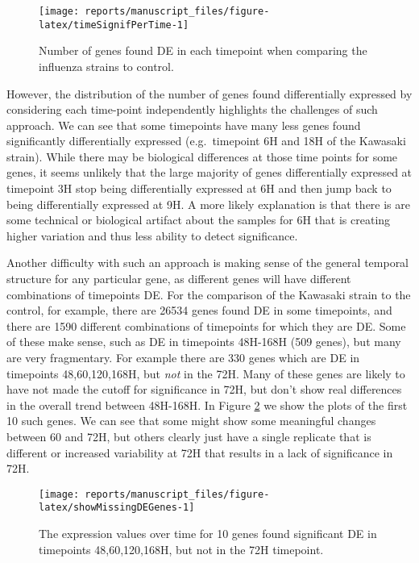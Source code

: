 \documentclass[9pt,a4paper,]{extarticle}
\begin{document}
\begin{figure}[H]

{\centering \texttt{[image: reports/manuscript\_files/figure-latex/timeSignifPerTime-1]} 

}

\caption{Number of genes found DE in each timepoint when comparing the influenza strains to control.}\label{fig:timeSignifPerTime}
\end{figure}

However, the distribution of the number of genes found differentially
expressed by considering each time-point independently highlights the
challenges of such approach. We can see that some timepoints have many less
genes found significantly differentially expressed (e.g.~timepoint 6H and 18H
of the Kawasaki strain). While there may be biological differences at those
time points for some genes, it seems unlikely that the large majority of genes
differentially expressed at timepoint 3H stop being differentially expressed
at 6H and then jump back to being differentially expressed at 9H. A more
likely explanation is that there is are some technical or biological artifact
about the samples for 6H that is creating higher variation and thus less
ability to detect significance.

Another difficulty with such an approach is making sense of the general
temporal structure for any particular gene, as different genes will have
different combinations of timepoints DE. For the comparison of the Kawasaki
strain to the control, for example, there are 26534 genes
found DE in some timepoints, and there are 1590 different
combinations of timepoints for which they are DE. Some of these make sense,
such as DE in timepoints 48H-168H (509 genes), but
many are very fragmentary. For example there are 330
genes which are DE in timepoints 48,60,120,168H, but \emph{not} in the 72H. Many of
these genes are likely to have not made the cutoff for significance in 72H,
but don't show real differences in the overall trend between 48H-168H. In Figure \ref{fig:showMissingDEGenes} we show the plots of the first 10 such genes. We can see that some might
show some meaningful changes between 60 and 72H, but others clearly just have
a single replicate that is different or increased variability at 72H that results in a lack of significance in 72H.

\begin{figure}[H]

{\centering \texttt{[image: reports/manuscript\_files/figure-latex/showMissingDEGenes-1]} 

}

\caption{The expression values over time for 10 genes found significant DE in timepoints 48,60,120,168H, but not in the 72H timepoint.}\label{fig:showMissingDEGenes}
\end{figure}
\end{document}
